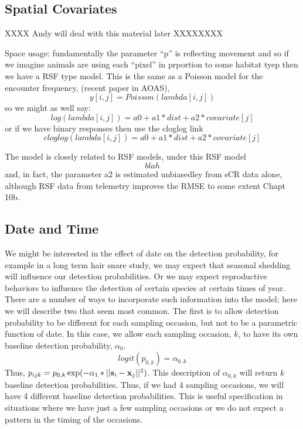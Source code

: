 \subsection{Spatial Covariates}

XXXX Andy will deal with this material later XXXXXXXX

Space usage: fundamentally the parameter ``p'' is reflecting movement
and so if we imagine animals are using each ``pixel'' in prportion to
some habitat tyep then we have a RSF type model. This is the same
as a Poisson model for the encounter frequency, (recent paper in AOAS),
\[
 y[i,j] = Poisson(lambda[i,j])
\]
so we might as well say:
\[
log(lambda[i,j]) = a0 + a1*dist + a2*covariate[j]
\]
or if we have binary responses then use the cloglog link
\[
 cloglog(lambda[i,j]) = a0 + a1*dist + a2*covariate[j]
\]

The model is closely related to RSF models, under this RSF model
\[
blah 
\]
 and, in fact, the parameter
a2 is estimated unbiasedley from sCR data alone, although RSF data
from telemetry improves the RMSE to some extent Chapt 10b. 





\subsection{Date and Time}

We might be interested in the effect of date on the detection
probability, for example in a long term hair snare study, we may
expect that seasonal shedding will influence our detection
probabilities.  Or we may expect reproductive behaviors to influence
the detection of certain species at certain times of year.  There are
a number of ways to incorporate such information into the model; here
we will describe two that seem most common.  The first is to allow
detection probability to be different for each sampling
occasion, but not to be a
parametric function of date.  In this case, we allow each sampling
occasion, $k$, to have its own baseline detection probability,
$\alpha_0$.
\[
logit(p_{0,k}) = \alpha_{0,k}
\]
Thus, $p_{ijk} = p_{0,k} \exp(- \alpha_1*||{\bf s}_{i}-{\bf x}_{j}||^2)$. This
description of $\alpha_{0,k}$ will return $k$ baseline detection
probabilities.  Thus, if we had 4 sampling occasions, we will have 4
different baseline detection probabilities.  This is useful
specification in situations where we have just a few sampling
occasions or we do not expect a pattern in the timing of the
occasions.

